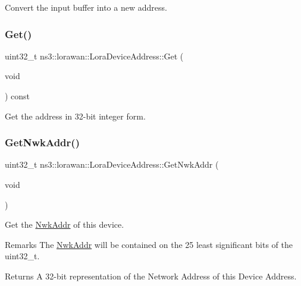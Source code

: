 Convert the input buffer into a new address. \mbox{\label{classns3_1_1lorawan_1_1LoraDeviceAddress_a35c8d5bd7f8ba32a206041ac0dd57cbc}} 
\subsubsection{\texorpdfstring{Get()}{Get()}}
{\footnotesize\ttfamily uint32\+\_\+t ns3\+::lorawan\+::\+Lora\+Device\+Address\+::\+Get (\begin{DoxyParamCaption}\item[{void}]{ }\end{DoxyParamCaption}) const}

Get the address in 32-\/bit integer form. \mbox{\label{classns3_1_1lorawan_1_1LoraDeviceAddress_a4879a48c10cf97a7fb07db00b8fcdb48}} 
\subsubsection{\texorpdfstring{Get\+Nwk\+Addr()}{GetNwkAddr()}}
{\footnotesize\ttfamily uint32\+\_\+t ns3\+::lorawan\+::\+Lora\+Device\+Address\+::\+Get\+Nwk\+Addr (\begin{DoxyParamCaption}\item[{void}]{ }\end{DoxyParamCaption})}

Get the \hyperlink{classns3_1_1lorawan_1_1NwkAddr}{Nwk\+Addr} of this device.

\begin{DoxyRemark}{Remarks}
The \hyperlink{classns3_1_1lorawan_1_1NwkAddr}{Nwk\+Addr} will be contained on the 25 least significant bits of the uint32\+\_\+t.
\end{DoxyRemark}
\begin{DoxyReturn}{Returns}
A 32-\/bit representation of the Network Address of this Device Address. 
\end{DoxyReturn}
\mbox{\label{classns3_1_1lorawan_1_1LoraDeviceAddress_a103e7e0827c9431014ae0181dea3f99f}} 
